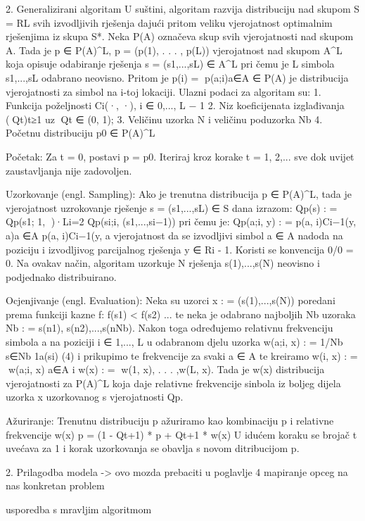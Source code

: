 2. Generalizirani algoritam
U suštini, algoritam razvija distribuciju nad skupom S = RL svih izvodljivih rješenja dajući pritom veliku vjerojatnost optimalnim rješenjima iz skupa S*.
Neka P(A) označeva skup svih vjerojatnosti nad skupom A. Tada je p ∈ P(A)^L, p = (p(1), . . . , p(L)) vjerojatnost nad skupom A^L koja opisuje odabiranje rješenja
s = (s1,...,sL) ∈ A^L pri čemu je L simbola s1,...,sL odabrano neovisno. Pritom je p(i) = p(a;i)a∈A ∈ P(A) je distribucija vjerojatnosti za simbol na i-toj lokaciji.
Ulazni podaci za algoritam su:
1. Funkcija poželjnosti Ci(·, ·), i ∈ {0,..., L − 1}
2. Niz koeficijenata izglađivanja (Qt)t≥1 uz Qt ∈ (0, 1);
3. Veličinu uzorka N i veličinu poduzorka Nb
4. Početnu distribuciju p0 ∈ P(A)^L

Početak:
Za t = 0, postavi p = p0. Iteriraj kroz korake t = 1, 2,... sve dok uvijet zaustavljanja nije zadovoljen.

Uzorkovanje (engl. Sampling):
Ako je trenutna distribucija p ∈ P(A)^L, tada je vjerojatnost uzrokovanje rješenje s = (s1,...,sL) ∈ S dana izrazom:
Qp(s) : = Qp(s1; 1, )·Li=2 Qp(si;i, (s1,...,si−1))
pri čemu je:
Qp(a;i, y) : = p(a, i)Ci−1(y, a)a	∈A p(a, i)Ci−1(y, a
vjerojatnost da se izvodljivi simbol a ∈ A nadoda na poziciju i izvodljivog parcijalnog rješenja y ∈ Ri - 1. Koristi se konvencija 0/0 = 0.
Na ovakav način, algoritam uzorkuje N rješenja s(1),...,s(N) neovisno i podjednako distribuirano.


Ocjenjivanje (engl. Evaluation):
Neka su uzorci x : = (s(1),...,s(N)) poredani prema funkciji kazne f:
f(s1) < f(s2) ...
te neka je odabrano najboljih Nb uzoraka Nb : = {s(n1), s(n2),...,s(nNb)}. Nakon toga određujemo relativnu frekvenciju simbola a na poziciji i ∈ {1,..., L}
u odabranom djelu uzorka
w(a;i, x) : = 1/Nb s∈Nb 1{a}(si) (4)
i prikupimo te frekvencije za svaki a ∈ A te kreiramo w(i, x) : = w(a;i, x) a∈A i
w(x) : = w(1, x), . . . ,w(L, x).
Tada je w(x) distribucija vjerojatnosti za P(A)^L koja daje relativne frekvencije sinbola iz boljeg dijela uzorka x uzorkovanog s vjerojatnosti Qp.



Ažuriranje:
Trenutnu distribuciju p ažuriramo kao kombinaciju p i relativne frekvencije w(x)
p = (1 - Qt+1) * p + Qt+1 * w(x)
U idućem koraku se brojač t uvećava za 1 i korak uzorkovanja se obavlja s novom ditribucijom p.






2. Prilagodba modela -> ovo mozda prebaciti u poglavlje 4
mapiranje opceg na nas konkretan problem




usporedba s mravljim algoritmom